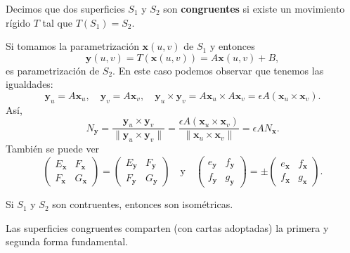 \begin{definition}
Decimos que dos superficies $\displaystyle S_{1} $ y $\displaystyle S_{2} $ son \textbf{congruentes} si existe un movimiento rígido $\displaystyle T $ tal que $\displaystyle T\left(S_{1}\right)=S_{2} $.
\end{definition}
\begin{observation}
Si tomamos la parametrización $\displaystyle \textbf{x} \left(u,v\right) $ de $\displaystyle S_{1} $ y entonces 
\[ \textbf{y} \left(u,v\right)=T\left( \textbf{x} \left(u,v\right)\right)=A \textbf{x} \left(u,v\right)+B ,\]
es parametrización de $\displaystyle S_{2} $. En este caso podemos observar que tenemos las igualdades:
\[ \textbf{y} _{u}= A \textbf{x} _{u} , \quad \textbf{y} _{v}= A \textbf{x} _{v}, \quad \textbf{y} _{u}\times \textbf{y} _{v}= A \textbf{x} _{u} \times A \textbf{x} _{v} = \epsilon A\left( \textbf{x} _{u} \times \textbf{x} _{v}\right) .\]
Así, 
\[ N_{ \textbf{y} }= \frac{ \textbf{y} _{u} \times \textbf{y} _{v}}{\| \textbf{y} _{u} \times \textbf{y} _{v}\|}=\frac{\epsilon A\left( \textbf{x} _{u}\times \textbf{x} _{v}\right)}{\| \textbf{x} _{u}\times \textbf{x} _{v}\|}=\epsilon AN_{ \textbf{x} } .\]
También se puede ver
\[\begin{pmatrix} E_{ \textbf{x} } & F_{ \textbf{x} } \\ F_{ \textbf{x} } & G_{ \textbf{x} } \end{pmatrix}=\begin{pmatrix} E_{ \textbf{y} } & F _{ \textbf{y} } \\ F_{ \textbf{y} } & G_{ \textbf{y} } \end{pmatrix}\quad \text{y} \quad \begin{pmatrix} e_{ \textbf{y} } & f_{ \textbf{y} } \\ f_{ \textbf{y} } & g_{ \textbf{y} } \end{pmatrix}=\pm \begin{pmatrix} e_{ \textbf{x} } & f_{ \textbf{x} } \\ f_{ \textbf{x} } & g_{ \textbf{x} } \end{pmatrix} .\]
\end{observation}
\begin{colorary}
Si $\displaystyle S_{1} $ y $\displaystyle S_{2} $ son contruentes, entonces son isométricas. 
\end{colorary}
\begin{colorary}
Las superficies congruentes comparten (con cartas adoptadas) la primera y segunda forma fundamental.
\end{colorary}
